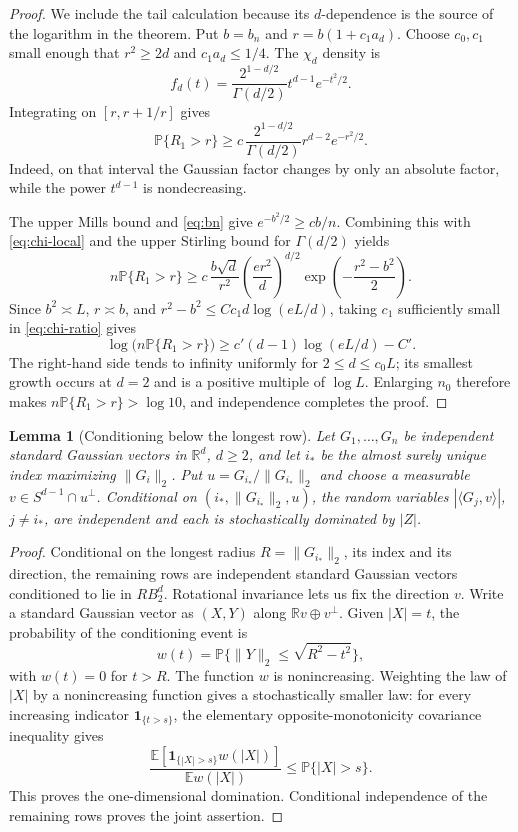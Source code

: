 \documentclass[11pt]{article}
\newtheorem{lemma}[theorem]{Lemma}
\newcommand{\R}{\mathbb R}
\newcommand{\Prob}{\mathbb P}
\begin{document}
\begin{proof}
We include the tail calculation because its $d$-dependence is the source of
the logarithm in the theorem.  Put $b=b_n$ and
$r=b(1+c_1a_d)$.  Choose $c_0,c_1$ small enough that
$r^2\ge2d$ and $c_1a_d\le1/4$.  The $\chi_d$ density is
\[
 f_d(t)=\frac{2^{1-d/2}}{\Gamma(d/2)}t^{d-1}e^{-t^2/2}.
\]
Integrating on $[r,r+1/r]$ gives
\begin{equation}\label{eq:chi-local}
 \Prob\{R_1>r\}\ge
 c\,\frac{2^{1-d/2}}{\Gamma(d/2)}r^{d-2}e^{-r^2/2}.
\end{equation}
Indeed, on that interval the Gaussian factor changes by only an absolute
factor, while the power $t^{d-1}$ is nondecreasing.

The upper Mills bound and \eqref{eq:bn} give
$e^{-b^2/2}\ge c b/n$.  Combining this with \eqref{eq:chi-local} and the
upper Stirling bound for $\Gamma(d/2)$ yields
\begin{equation}\label{eq:chi-ratio}
 n\Prob\{R_1>r\}
 \ge c\,\frac{b\sqrt d}{r^2}
       \left(\frac{er^2}{d}\right)^{d/2}
       \exp\left(-\frac{r^2-b^2}{2}\right).
\end{equation}
Since $b^2\asymp L$, $r\asymp b$, and
$r^2-b^2\le Cc_1d\log(eL/d)$, taking $c_1$ sufficiently small in
\eqref{eq:chi-ratio} gives
\[
 \log\bigl(n\Prob\{R_1>r\}\bigr)
 \ge c'(d-1)\log(eL/d)-C'.
\]
The right-hand side tends to infinity uniformly for
$2\le d\le c_0L$; its smallest growth occurs at $d=2$ and is a positive
multiple of $\log L$.  Enlarging $n_0$ therefore makes
$n\Prob\{R_1>r\}>\log 10$, and independence completes the proof.
\end{proof}

\begin{lemma}[Conditioning below the longest row]\label{lem:conditioning}
Let $G_1,\ldots,G_n$ be independent standard Gaussian vectors in $\R^d$,
$d\ge2$, and let $i_*$ be the almost surely unique index maximizing
$\|G_i\|_2$.  Put $u=G_{i_*}/\|G_{i_*}\|_2$ and choose a measurable
$v\in S^{d-1}\cap u^\perp$.  Conditional on
$(i_*,\|G_{i_*}\|_2,u)$, the random variables
$|\langle G_j,v\rangle|$, $j\ne i_*$, are independent and each is
stochastically dominated by $|Z|$.
\end{lemma}

\begin{proof}
Conditional on the longest radius $R=\|G_{i_*}\|_2$, its index and its
direction, the remaining rows are independent standard Gaussian vectors
conditioned to lie in $RB_2^d$.  Rotational invariance lets us fix the
direction $v$.  Write a standard Gaussian vector as $(X,Y)$ along
$\R v\oplus v^\perp$.  Given $|X|=t$, the probability of the conditioning
event is
\[
 w(t)=\Prob\{\|Y\|_2\le\sqrt{R^2-t^2}\},
\]
with $w(t)=0$ for $t>R$.  The function $w$ is nonincreasing.  Weighting the
law of $|X|$ by a nonincreasing function gives a stochastically smaller
law: for every increasing indicator $\mathbf1_{\{t>s\}}$, the elementary
opposite-monotonicity covariance inequality gives
\[
 \frac{\mathbb E[\mathbf1_{\{|X|>s\}}w(|X|)]}{\mathbb Ew(|X|)}
 \le \Prob\{|X|>s\}.
\]
This proves the one-dimensional domination.  Conditional independence of
the remaining rows proves the joint assertion.
\end{proof}
\end{document}
